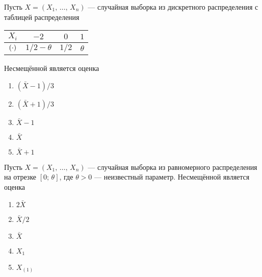 \documentclass[t]{beamer}
\let\P\relax
\DeclareMathOperator{\P}{\mathbb{P}}
\begin{document}
 \begin{frame} \label{26} 
\begin{block}{26} 

    Пусть $X = (X_1, \, \ldots, \, X_n)$ — случайная выборка из дискретного распределения с таблицей распределения

\begin{center}
  \begin{tabular}{cccc}
  \toprule
    $X_i$  & $-2$    & $0$      & $1$  \\
    \midrule
    $\P(\cdot)$        & $1/2 - \theta$      & $1/2$    & $\theta$  \\
  \bottomrule
  \end{tabular}
\end{center}

Несмещённой является оценка


 \end{block} 
\begin{enumerate} 
\item[] \hyperlink{26-No}{\beamergotobutton{} $(\bar{X} - 1) / 3$}
\item[] \hyperlink{26-Yes}{\beamergotobutton{} $(\bar{X} + 1) / 3$}
\item[] \hyperlink{26-No}{\beamergotobutton{} $\bar{X} - 1$}
\item[] \hyperlink{26-No}{\beamergotobutton{} $\bar{X}$}
\item[] \hyperlink{26-No}{\beamergotobutton{} $\bar{X} + 1$}
\end{enumerate} 
\end{frame} 


 \begin{frame} \label{27} 
\begin{block}{27} 

   Пусть $X = (X_1, \, \ldots, \, X_n)$ — случайная выборка из равномерного распределения на отрезке $[0; \, \theta]$, где $\theta > 0$ — неизвестный параметр. Несмещённой является оценка


 \end{block} 
\begin{enumerate} 
\item[] \hyperlink{27-Yes}{\beamergotobutton{} $2 \bar{X}$}
\item[] \hyperlink{27-No}{\beamergotobutton{} $\bar{X} / 2$}
\item[] \hyperlink{27-No}{\beamergotobutton{} $\bar{X}$}
\item[] \hyperlink{27-No}{\beamergotobutton{} $X_1$}
\item[] \hyperlink{27-No}{\beamergotobutton{} $X_{(1)}$}
\end{enumerate} 
\end{frame} 
\end{document}
